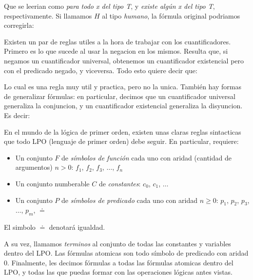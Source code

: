 \documentclass{article}
\begin{document}
Que se leerian como \textit{para todo x del tipo T}, y \textit{existe algún x del tipo T}, respectivamente. Si llamamos $H$ al tipo \textit{humano}, la fórmula original podriamos corregirla:


Existen un par de reglas utiles a la hora de trabajar con los cuantificadores. Primero es lo que sucede al usar la negacion en los mismos. Resulta que, si negamos un cuantificador universal, obtenemos un cuantificador existencial pero con el predicado negado, y viceversa. Todo esto quiere decir que:


Lo cual es una regla muy util y practica, pero no la unica. También hay formas de generalizar fórmulas: en particular, decimos que un cuantificador universal generaliza la conjuncion, y un cuantificador existencial generaliza la disyuncion. Es decir:


En el mundo de la lógica de primer orden, existen unas claras reglas sintacticas que todo LPO (lenguaje de primer orden) debe seguir. En particular, requiere:

\begin{itemize}
	
	\item Un conjunto $F$ de \textit{símbolos de función} cada uno con aridad (cantidad de argumentos) $n>0$: $f_{1}$, $f_{2}$, $f_{3}$, $\ldots$, $f_{n}$
	
	\item Un conjunto numberable $C$ de \textit{constantes}: $c_{0}$, $c_{1}$, $\ldots$
	
	\item Un conjunto $P$ de \textit{símbolos de predicado} cada uno con aridad $n \geq 0$: $p_{1}$, $p_{2}$, $p_{3}$, $\ldots$, $p_{m}$, $\doteq$

\end{itemize}

El simbolo $\doteq$ denotará igualdad.

A su vez, llamamos \textit{terminos} al conjunto de todas las constantes y variables dentro del LPO. Las fórmulas atomicas son todo símbolo de predicado con aridad 0. Finalmente, les decimos fórmulas a todas las fórmulas atomicas dentro del LPO, y todas las que puedas formar con las operaciones lógicas antes vistas.
\end{document}
